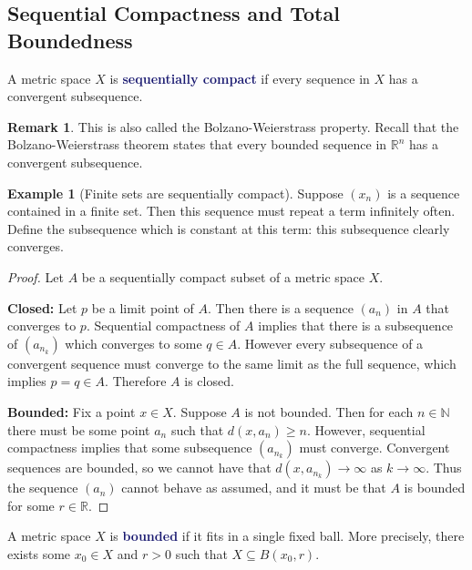 \documentclass[11pt]{article}
\numberwithin{equation}{section}
\newcommand{\navy}[1]{\textcolor{MidnightBlue}{\bf #1}}
\theoremstyle{definition}
\theoremstyle{definition}
\newtheorem{example}{\color{WildStrawberry}Example}[section]
\newtheorem*{remark}{Remark}
\newcommand{\1}{\mathbbm 1}
\newcommand{\RR}{\mathbb R}
\newcommand{\NN}{\mathbb N}
\begin{document}
\subsection{Sequential Compactness and Total Boundedness}

\begin{definition}
	A metric space $X$ is \navy{sequentially compact} if every sequence in $X$ has a convergent subsequence. 
	\begin{remark}
	This is also called the Bolzano-Weierstrass property. Recall that the Bolzano-Weierstrass theorem states that every bounded sequence in $\RR^n$ has a convergent subsequence. 
	\end{remark}	
\end{definition}

\begin{example}[Finite sets are sequentially compact]
	Suppose $(x_n)$ is a sequence contained in a finite set. Then this sequence must repeat a term infinitely often. Define the subsequence which is constant at this term: this subsequence clearly converges. 
\end{example}

\begin{theorem}
\end{theorem}
\begin{proof}
	Let $A$ be a sequentially compact subset of a metric space $X$.

	\textbf{Closed:} Let $p$ be a limit point of $A$. Then there is a sequence $(a_n)$ in $A$ that converges to $p$. Sequential compactness of $A$ implies that there is a subsequence of $(a_{n_k})$ which converges to some $q \in A$. However every subsequence of a convergent sequence must converge to the same limit as the full sequence, which implies $p=q \in A$. Therefore $A$ is closed. 

	\textbf{Bounded:} Fix a point $x \in X$. Suppose $A$ is not bounded. Then for each $n \in \NN$ there must be some point $a_n$ such that $d(x,a_n) \geq n$. However, sequential compactness implies that some subsequence $(a_{n_k})$ must converge. Convergent sequences are bounded, so we cannot have that $d(x,a_{n_k}) \to \infty$ as $k \to \infty$. Thus the sequence $(a_n)$ cannot behave as assumed, and it must be that $A$ is bounded for some $r \in \RR$. 

\end{proof}


\begin{definition}
	A metric space $X$ is \navy{bounded} if it fits in a single fixed ball. More precisely, there exists some $x_0 \in X$ and $r > 0$ such that $X \subseteq B(x_0,r)$. 
\end{definition}
\end{document}
